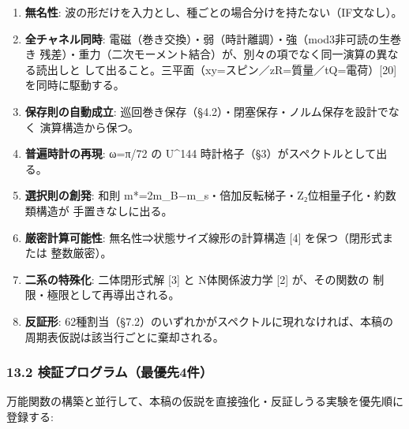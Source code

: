 \documentclass[
]{ltjsarticle}
\providecommand{\tightlist}{%
  \setlength{\itemsep}{0pt}\setlength{\parskip}{0pt}}
\begin{document}
\begin{enumerate}
\def\labelenumi{\arabic{enumi}.}
\tightlist
\item
  \textbf{無名性}:
  波の形だけを入力とし、種ごとの場合分けを持たない（IF文なし）。
\item
  \textbf{全チャネル同時}:
  電磁（巻き交換）・弱（時計離調）・強（mod3非可読の生巻き
  残差）・重力（二次モーメント結合）が、別々の項でなく同一演算の異なる読出しと
  して出ること。三平面（xy=スピン／zR=質量／tQ=電荷）{[}20{]}
  を同時に駆動する。
\item
  \textbf{保存則の自動成立}:
  巡回巻き保存（§4.2）・閉塞保存・ノルム保存を設計でなく
  演算構造から保つ。
\item
  \textbf{普遍時計の再現}: ω=π/72 の U\^{}144
  時計格子（§3）がスペクトルとして出る。
\item
  \textbf{選択則の創発}: 和則
  m*=2m\_B−m\_s・倍加反転梯子・Z₂位相量子化・約数類構造が
  手置きなしに出る。
\item
  \textbf{厳密計算可能性}: 無名性⇒状態サイズ線形の計算構造 {[}4{]}
  を保つ（閉形式または 整数厳密）。
\item
  \textbf{二系の特殊化}: 二体閉形式解 {[}3{]} と N体関係波力学 {[}2{]}
  が、その関数の 制限・極限として再導出される。
\item
  \textbf{反証形}:
  62種割当（§7.2）のいずれかがスペクトルに現れなければ、本稿の
  周期表仮説は該当行ごとに棄却される。
\end{enumerate}

\subsubsection{13.2
検証プログラム（最優先4件）}\label{ux691cux8a3cux30d7ux30edux30b0ux30e9ux30e0ux6700ux512aux51484ux4ef6}

万能関数の構築と並行して、本稿の仮説を直接強化・反証しうる実験を優先順に登録する:
\end{document}
